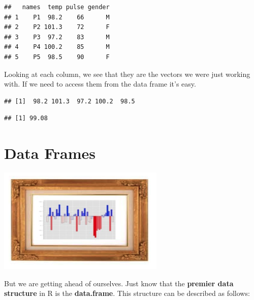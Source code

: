 \documentclass[]{book}
\newenvironment{Shaded}{\begin{snugshade}}{\end{snugshade}}
\newcommand{\CommentTok}[1]{\textcolor[rgb]{0.56,0.35,0.01}{\textit{#1}}}
\newcommand{\KeywordTok}[1]{\textcolor[rgb]{0.13,0.29,0.53}{\textbf{#1}}}
\newcommand{\NormalTok}[1]{#1}
\newcommand{\OperatorTok}[1]{\textcolor[rgb]{0.81,0.36,0.00}{\textbf{#1}}}
\begin{document}
\begin{verbatim}
##   names  temp pulse gender
## 1    P1  98.2    66      M
## 2    P2 101.3    72      F
## 3    P3  97.2    83      M
## 4    P4 100.2    85      M
## 5    P5  98.5    90      F
\end{verbatim}

Looking at each column, we see that they are the vectors we were just working with. If we need to access them from the data frame it's easy.

\begin{Shaded}
\end{Shaded}

\begin{verbatim}
## [1]  98.2 101.3  97.2 100.2  98.5
\end{verbatim}

\begin{Shaded}
\end{Shaded}

\begin{verbatim}
## [1] 99.08
\end{verbatim}

\hypertarget{data-frames}{%
\section{Data Frames}\label{data-frames}}

\includegraphics[width=3.125in,height=\textheight]{./figures/dframe.png}

But we are getting ahead of ourselves. Just know that the \textbf{premier data structure} in R is the \textbf{data.frame}. This structure can be described as follows:
\end{document}
